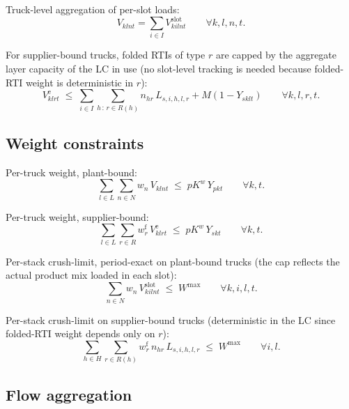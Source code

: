 Truck-level aggregation of per-slot loads:
\begin{equation}
V_{klnt}=\sum_{i\in I} V^{\mathrm{slot}}_{kilnt}
\qquad \forall k,l,n,t.
\label{sb:eq:slot-agg}
\end{equation}

For supplier-bound trucks, folded RTIs of type $r$ are capped by the
aggregate layer capacity of the LC in use (no slot-level tracking is
needed because folded-RTI weight is deterministic in $r$):
\begin{equation}
V^{\mathrm{e}}_{klrt}
\;\le\;\sum_{i\in I}\sum_{h\,:\,r\in R(h)} n_{hr}\,L_{s,i,h,l,r}
    + M(1-Y_{sklt})
\qquad \forall k,l,r,t.
\label{sb:eq:empty-cap}
\end{equation}

\subsection*{Weight constraints}

Per-truck weight, plant-bound:
\begin{equation}
\sum_{l\in L}\sum_{n\in N} w_{n}\,V_{klnt}\;\le\;pK^{w}\,Y_{pkt}
\qquad \forall k,t.
\label{sb:eq:truck-w-plant}
\end{equation}

Per-truck weight, supplier-bound:
\begin{equation}
\sum_{l\in L}\sum_{r\in R} w^{\mathrm{f}}_{r}\,V^{\mathrm{e}}_{klrt}
    \;\le\;pK^{w}\,Y_{skt}
\qquad \forall k,t.
\label{sb:eq:truck-w-sup}
\end{equation}

Per-stack crush-limit, period-exact on plant-bound trucks (the cap
reflects the actual product mix loaded in each slot):
\begin{equation}
\sum_{n\in N} w_{n}\,V^{\mathrm{slot}}_{kilnt}\;\le\;W^{\max}
\qquad \forall k,i,l,t.
\label{sb:eq:stack-w-plant}
\end{equation}

Per-stack crush-limit on supplier-bound trucks (deterministic in the
LC since folded-RTI weight depends only on $r$):
\begin{equation}
\sum_{h\in H}\sum_{r\in R(h)}
    w^{\mathrm{f}}_{r}\,n_{hr}\,L_{s,i,h,l,r}\;\le\;W^{\max}
\qquad \forall i,l.
\label{sb:eq:stack-w-sup}
\end{equation}

\subsection*{Flow aggregation}


